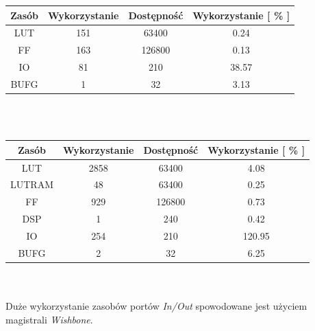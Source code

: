 \documentclass[11pt,a4paper]{article}
\begin{document}
	\begin{minipage}[c]{\textwidth}
		 \begin{center}
				\begin{tabular}{|c|c|c|c|}
					\hline
					Zasób & Wykorzystanie & Dostępność & Wykorzystanie [ \% ] \\ 
					\hline
					LUT & 151 & 63400 & 0.24  \\
					\hline
					FF & 163 & 126800 & 0.13 \\
					\hline
					IO & 81 & 210 & 38.57 \\
					\hline
					BUFG & 1 & 32 & 3.13 \\
					\hline
				\end{tabular}
		\end{center}
\end{minipage}\\
\\
	\begin{minipage}[c]{\textwidth}
		 \begin{center}
				\begin{tabular}{|c|c|c|c|}
					\hline
					Zasób & Wykorzystanie & Dostępność & Wykorzystanie [ \% ] \\ 
					\hline
					LUT & 2858 & 63400 & 4.08  \\
					\hline
					LUTRAM & 48 & 63400 & 0.25  \\
					\hline
					FF & 929 & 126800 & 0.73 \\
					\hline
					DSP & 1 & 240 & 0.42  \\
					\hline
					IO & 254 & 210 & 120.95 \\
					\hline
					BUFG & 2 & 32 & 6.25 \\
					\hline
				\end{tabular}
		\end{center}
\end{minipage}\\
\\
Duże wykorzystanie zasobów portów \textit{In/Out} spowodowane jest użyciem magistrali \textit{Wishbone}.
\end{document}
